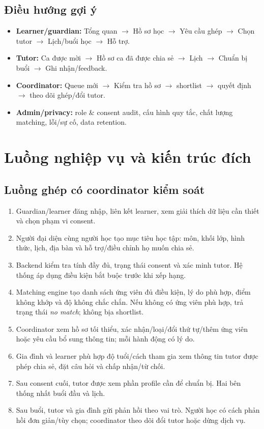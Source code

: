\documentclass[11pt,a4paper]{article}
\begin{document}
\subsection{Điều hướng gợi ý}
\begin{itemize}
  \item \textbf{Learner/guardian:} Tổng quan \(\rightarrow\) Hồ sơ học \(\rightarrow\) Yêu cầu ghép \(\rightarrow\) Chọn tutor \(\rightarrow\) Lịch/buổi học \(\rightarrow\) Hỗ trợ.
  \item \textbf{Tutor:} Ca được mời \(\rightarrow\) Hồ sơ ca đã được chia sẻ \(\rightarrow\) Lịch \(\rightarrow\) Chuẩn bị buổi \(\rightarrow\) Ghi nhận/feedback.
  \item \textbf{Coordinator:} Queue mới \(\rightarrow\) Kiểm tra hồ sơ \(\rightarrow\) shortlist \(\rightarrow\) quyết định \(\rightarrow\) theo dõi ghép/đổi tutor.
  \item \textbf{Admin/privacy:} role \& consent audit, cấu hình quy tắc, chất lượng matching, lỗi/sự cố, data retention.
\end{itemize}

\section{Luồng nghiệp vụ và kiến trúc đích}

\subsection{Luồng ghép có coordinator kiểm soát}
\begin{enumerate}
  \item Guardian/learner đăng nhập, liên kết learner, xem giải thích dữ liệu cần thiết và chọn phạm vi consent.
  \item Người đại diện cùng người học tạo mục tiêu học tập: môn, khối lớp, hình thức, lịch, địa bàn và hỗ trợ/điều chỉnh họ muốn chia sẻ.
  \item Backend kiểm tra tính đầy đủ, trạng thái consent và xác minh tutor. Hệ thống áp dụng điều kiện bắt buộc trước khi xếp hạng.
  \item Matching engine tạo danh sách ứng viên đủ điều kiện, lý do phù hợp, điểm không khớp và độ không chắc chắn. Nếu không có ứng viên phù hợp, trả trạng thái \emph{no match}; không bịa shortlist.
  \item Coordinator xem hồ sơ tối thiểu, xác nhận/loại/đổi thứ tự/thêm ứng viên hoặc yêu cầu bổ sung thông tin; mỗi hành động có lý do.
  \item Gia đình và learner phù hợp độ tuổi/cách tham gia xem thông tin tutor được phép chia sẻ, đặt câu hỏi và chấp nhận/từ chối.
  \item Sau consent cuối, tutor được xem phần profile cần để chuẩn bị. Hai bên thống nhất buổi đầu và lịch.
  \item Sau buổi, tutor và gia đình gửi phản hồi theo vai trò. Người học có cách phản hồi đơn giản/tùy chọn; coordinator theo dõi đổi tutor hoặc dừng dịch vụ.
\end{enumerate}
\end{document}
